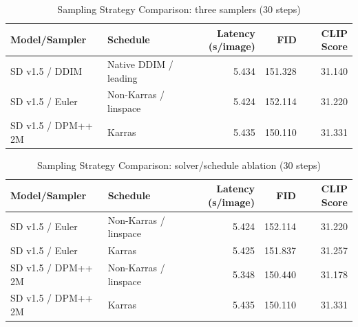 
\begin{table}[htbp]
\centering
\caption{Sampling Strategy Comparison: three samplers (30 steps)}
\label{tab:member-b-samplers}
\begin{tabular}{llrrr}
\toprule
Model/Sampler & Schedule & Latency (s/image) & FID & CLIP Score \\
\midrule
SD v1.5 / DDIM & Native DDIM / leading & 5.434 & 151.328 & 31.140 \\
SD v1.5 / Euler & Non-Karras / linspace & 5.424 & 152.114 & 31.220 \\
SD v1.5 / DPM++ 2M & Karras & 5.435 & 150.110 & 31.331 \\
\bottomrule
\end{tabular}
\end{table}

\begin{table}[htbp]
\centering
\caption{Sampling Strategy Comparison: solver/schedule ablation (30 steps)}
\label{tab:member-b-solver-schedule}
\begin{tabular}{llrrr}
\toprule
Model/Sampler & Schedule & Latency (s/image) & FID & CLIP Score \\
\midrule
SD v1.5 / Euler & Non-Karras / linspace & 5.424 & 152.114 & 31.220 \\
SD v1.5 / Euler & Karras & 5.425 & 151.837 & 31.257 \\
SD v1.5 / DPM++ 2M & Non-Karras / linspace & 5.348 & 150.440 & 31.178 \\
SD v1.5 / DPM++ 2M & Karras & 5.435 & 150.110 & 31.331 \\
\bottomrule
\end{tabular}
\end{table}
